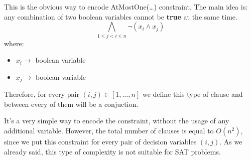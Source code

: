 This is the obvious way to encode AtMostOne(\dots) constraint. The main idea is: any combination of two boolean variables cannot be \textbf{true} at the 
same time. 
$$\bigwedge_{1 \leq j < i \leq n} \neg(x_i \wedge x_j)$$
where:
\begin{itemize}
    \renewcommand{\labelitemi}{-}
    \item $x_i \rightarrow$ boolean variable 
    \item $x_j \rightarrow$ boolean variable 
\end{itemize}
Therefore, for every pair $(i,j) \in [1, \dots, n]$ we define this type of clause and between every of them will be a conjuction. \vspace{7pt}

It's a very simple way to encode the constraint, without the usage of any additional variable. However, the total number of clauses is equal to $O(n^2)$, 
since we put this constraint for every pair of decision variables $(i,j)$. As we already said, this type of complexity is not suitable for SAT problems.